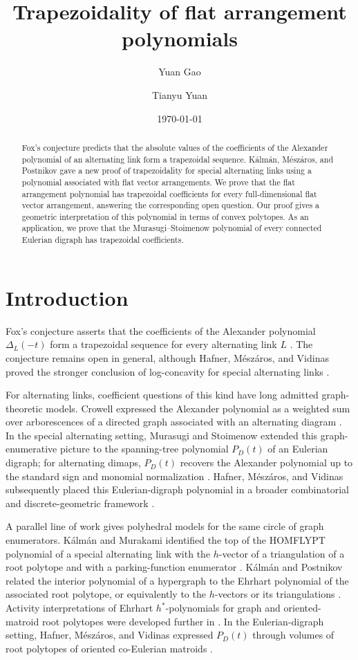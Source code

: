 \documentclass[12pt]{amsart}
\title{Trapezoidality of flat arrangement polynomials}
\author{Yuan Gao}
\author{Tianyu Yuan}
\date{\today}
\numberwithin{equation}{section}
\numberwithin{theorem}{section}
\begin{document}
\begin{abstract}
    Fox's conjecture predicts that the absolute values of the coefficients of the Alexander polynomial of an alternating link form a trapezoidal sequence. Kálmán, Mészáros, and Postnikov gave a new proof of trapezoidality for special alternating links using a polynomial associated with flat vector arrangements. We prove that the flat arrangement polynomial has trapezoidal coefficients for every full-dimensional flat vector arrangement, answering the corresponding open question. Our proof gives a geometric interpretation of this polynomial in terms of convex polytopes. As an application, we prove that the Murasugi--Stoimenow polynomial of every connected Eulerian digraph has trapezoidal coefficients. 
\end{abstract}

\maketitle

\tableofcontents

\section{Introduction}

Fox's conjecture asserts that the coefficients of the Alexander polynomial $\Delta_L(-t)$ form a trapezoidal sequence for every alternating link $L$ \cite{Fox62}.
The conjecture remains open in general, although Hafner, Mészáros, and Vidinas proved the stronger conclusion of log-concavity for special alternating links \cite[Theorem~1.2]{HMV24}.

For alternating links, coefficient questions of this kind have long admitted graph-theoretic models. Crowell expressed the Alexander polynomial as a weighted sum over arborescences of a directed graph associated with an alternating diagram \cite{Crowell59}. In the special alternating setting, Murasugi and Stoimenow extended this graph-enumerative picture to the spanning-tree polynomial $P_D(t)$ of an Eulerian digraph; for alternating dimaps, $P_D(t)$ recovers the Alexander polynomial up to the standard sign and monomial normalization \cite{MS03}. Hafner, Mészáros, and Vidinas subsequently placed this Eulerian-digraph polynomial in a broader combinatorial and discrete-geometric framework \cite{HMVGeneralized}.

A parallel line of work gives polyhedral models for the same circle of graph enumerators.
Kálmán and Murakami identified the top of the HOMFLYPT polynomial of a special alternating link with the $h$-vector of a triangulation of a root polytope and with a parking-function enumerator \cite{KM17}. Kálmán and Postnikov related the interior polynomial of a hypergraph to the Ehrhart polynomial of the associated root polytope, or equivalently to the $h$-vectors or its triangulations \cite{KP17}. Activity interpretations of Ehrhart $h^*$-polynomials for graph and oriented-matroid root polytopes were developed further in \cite{KT23,Tothmeresz24}. In the Eulerian-digraph setting, Hafner, Mészáros, and Vidinas expressed $P_D(t)$ through volumes of root polytopes of oriented co-Eulerian matroids \cite[Theorem~1.7]{HMVGeneralized}.
\end{document}
